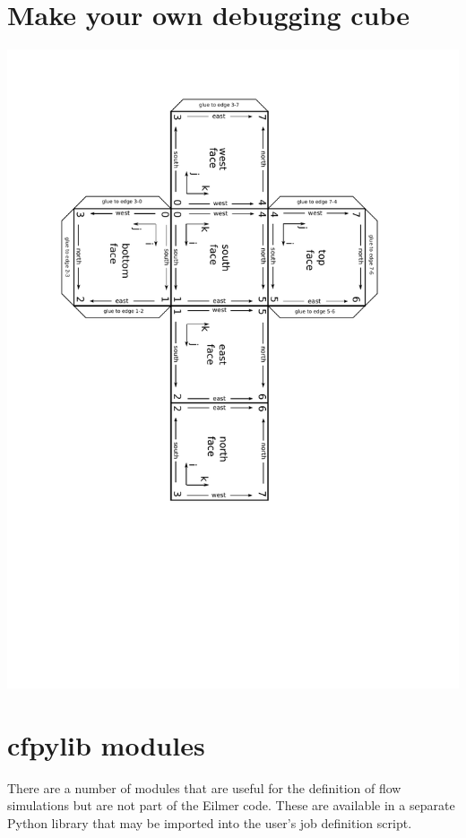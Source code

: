 \documentclass[12pt,a4paper,twoside]{article}
\begin{document}
\section{Make your own debugging cube}
\label{cube-development}
%
\centerline{\includegraphics[viewport=69 220 490 778,clip=true,angle=180]{figs/paper-cube-development.pdf}}

%

\cleardoublepage
\section{cfpylib modules}
There are a number of modules that are useful for the definition of flow
simulations but are not part of the Eilmer code.
These are available in a separate Python library that may be imported into the
user's job definition script.
 
\end{document}
